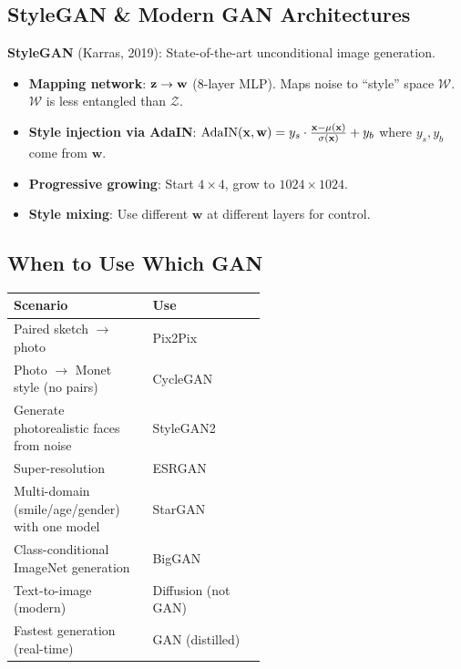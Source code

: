 \subsection{StyleGAN \& Modern GAN Architectures}
\textbf{StyleGAN} (Karras, 2019): State-of-the-art unconditional image generation.
\begin{itemize}
\item \textbf{Mapping network}: $\mathbf{z} \to \mathbf{w}$ (8-layer MLP). Maps noise to ``style'' space $\mathcal{W}$. $\mathcal{W}$ is less entangled than $\mathcal{Z}$.
\item \textbf{Style injection via AdaIN}: $\text{AdaIN}(\mathbf{x}, \mathbf{w}) = y_s \cdot \frac{\mathbf{x} - \mu(\mathbf{x})}{\sigma(\mathbf{x})} + y_b$ where $y_s, y_b$ come from $\mathbf{w}$.
\item \textbf{Progressive growing}: Start $4{\times}4$, grow to $1024{\times}1024$.
\item \textbf{Style mixing}: Use different $\mathbf{w}$ at different layers for control.
\end{itemize}

\subsection{When to Use Which GAN}
\begin{center}\small
\begin{tabular}{p{0.55\linewidth}l}\toprule
\textbf{Scenario} & \textbf{Use} \\\midrule
Paired sketch $\to$ photo & Pix2Pix \\
Photo $\to$ Monet style (no pairs) & CycleGAN \\
Generate photorealistic faces from noise & StyleGAN2 \\
Super-resolution & ESRGAN \\
Multi-domain (smile/age/gender) with one model & StarGAN \\
Class-conditional ImageNet generation & BigGAN \\
Text-to-image (modern) & Diffusion (not GAN) \\
Fastest generation (real-time) & GAN (distilled) \\
\bottomrule
\end{tabular}
\end{center}

